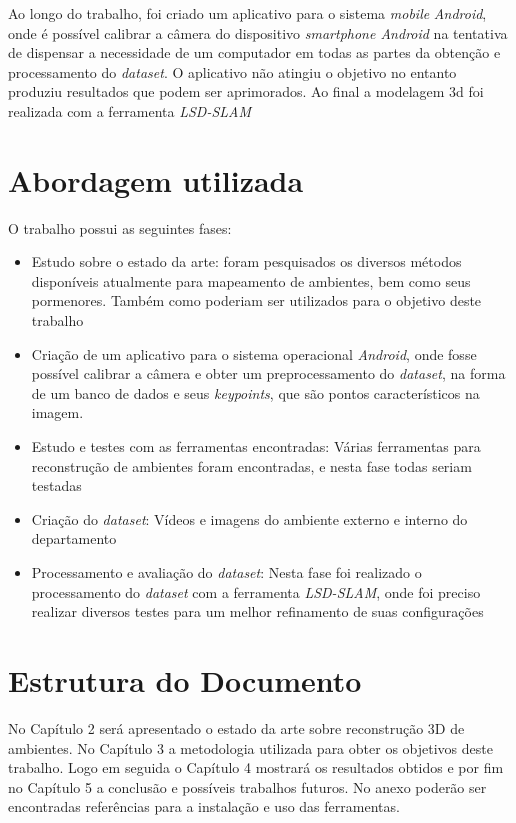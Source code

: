 Ao longo do trabalho, foi criado um aplicativo para o sistema \textit{mobile} \textit{Android}, onde é possível calibrar a câmera do dispositivo \textit{smartphone Android} na tentativa de dispensar a necessidade de um computador em todas as partes da obtenção e processamento do \textit{dataset}. O aplicativo não atingiu o objetivo no entanto produziu resultados que podem ser aprimorados. Ao final a modelagem 3d foi realizada com a ferramenta \textit{LSD-SLAM}


\section{Abordagem utilizada}

O trabalho possui as seguintes fases:
\begin{itemize}
\item{Estudo sobre o estado da arte: foram pesquisados os diversos métodos disponíveis atualmente para mapeamento de ambientes, bem como seus pormenores. Também como  poderiam ser utilizados para o objetivo deste trabalho}
\item{Criação de um aplicativo para o sistema operacional \textit{Android}, onde fosse possível calibrar a câmera e obter um preprocessamento do \textit{dataset}, na forma de um banco de dados e seus \textit{keypoints}, que são pontos característicos na imagem.}
\item{Estudo e testes com as ferramentas encontradas: Várias ferramentas para reconstrução de ambientes foram encontradas, e nesta fase todas seriam testadas}
\item{Criação do \textit{dataset}: Vídeos e imagens do ambiente externo e interno do departamento}
\item{Processamento e avaliação do \textit{dataset}: Nesta fase foi realizado o processamento do \textit{dataset} com a ferramenta \textit{LSD-SLAM}, onde foi preciso realizar diversos testes para um melhor refinamento de suas configurações}
\end{itemize}


\section{Estrutura do Documento}

No Capítulo 2 será apresentado o estado da arte sobre reconstrução 3D de ambientes. No Capítulo 3 a metodologia utilizada para obter os objetivos deste trabalho. Logo em seguida o Capítulo 4 mostrará os resultados obtidos e por fim no Capítulo 5 a conclusão e possíveis trabalhos futuros. No anexo poderão ser encontradas referências para a instalação e uso das ferramentas.
